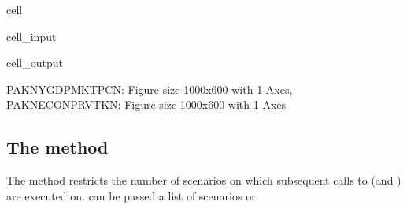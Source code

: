 \documentclass[letterpaper,10pt,english]{jupyterBook}
\begin{document}
\begin{sphinxuseclass}{cell}\begin{sphinxVerbatimInput}

\begin{sphinxuseclass}{cell_input}
\begin{sphinxVerbatim}[commandchars=\\\{\}]
  
\end{sphinxVerbatim}

\end{sphinxuseclass}\end{sphinxVerbatimInput}
\begin{sphinxVerbatimOutput}

\begin{sphinxuseclass}{cell_output}
\begin{sphinxVerbatim}[commandchars=\\\{\}]
\PYGZob{}\PYGZsq{}PAKNYGDPMKTPCN\PYGZsq{}: \PYGZlt{}Figure size 1000x600 with 1 Axes\PYGZgt{},
 \PYGZsq{}PAKNECONPRVTKN\PYGZsq{}: \PYGZlt{}Figure size 1000x600 with 1 Axes\PYGZgt{}\PYGZcb{}
\end{sphinxVerbatim}

\end{sphinxuseclass}\end{sphinxVerbatimOutput}

\end{sphinxuseclass}

\subsection{The  method}
\label{\detokenize{content/06_WBModels/ScenarioAnalysis:the-keep-switch-method}}
\sphinxAtStartPar
The  method restricts the number of scenarios on which subsequent calls to  (and ) are executed on.   can be passed a list of scenarios or
\end{document}
